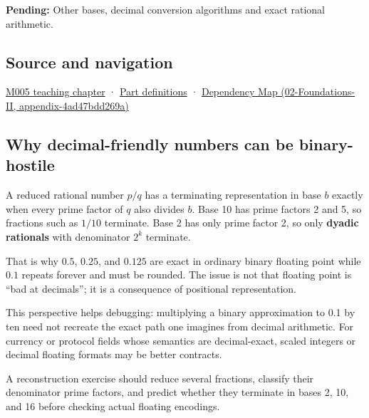 \textbf{Pending:} Other bases, decimal conversion algorithms and exact rational arithmetic.

\subsection{Source and navigation}\label{appendix-2a2f1b74bdd3-source-and-navigation}

\hyperref[01-foundations-i-ch001-when-arithmetic-meets-uncertainty]{M005 teaching chapter} · \hyperref[appendix-fd090d982a15-m005---parts-77-88]{Part definitions} · \href{../02-Foundations-II/main.pdf\#nameddest=appendix-4ad47bdd269a}{Dependency Map (02-Foundations-II, appendix-4ad47bdd269a)}

\subsection{Why decimal-friendly numbers can be binary-hostile}\label{appendix-2a2f1b74bdd3-why-decimal-friendly-numbers-can-be-binary-hostile}

A reduced rational number \(p/q\) has a terminating representation in base \(b\) exactly when every prime factor of \(q\) also divides \(b\). Base 10 has prime factors 2 and 5, so fractions such as \(1/10\) terminate. Base 2 has only prime factor 2, so only \textbf{dyadic rationals} with denominator \(2^k\) terminate.

That is why \(0.5\), \(0.25\), and \(0.125\) are exact in ordinary binary floating point while \(0.1\) repeats forever and must be rounded. The issue is not that floating point is ``bad at decimals''; it is a consequence of positional representation.

This perspective helps debugging: multiplying a binary approximation to 0.1 by ten need not recreate the exact path one imagines from decimal arithmetic. For currency or protocol fields whose semantics are decimal-exact, scaled integers or decimal floating formats may be better contracts.

A reconstruction exercise should reduce several fractions, classify their denominator prime factors, and predict whether they terminate in bases 2, 10, and 16 before checking actual floating encodings.
